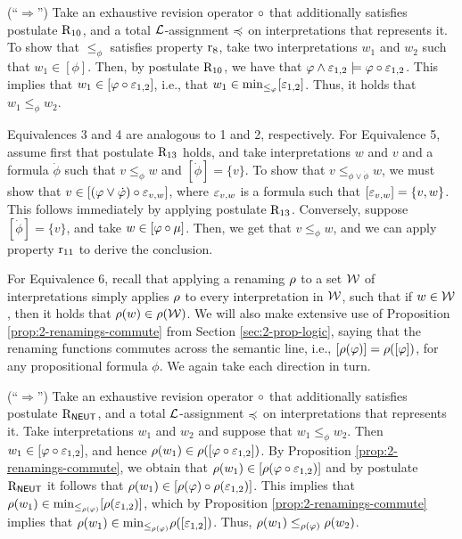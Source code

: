 \begin{prf*}{}{}
	(``$\Rightarrow$'')
	Take an exhaustive revision operator $\circ$ that additionally satisfies postulate $\mathrm{R}_{10}$,
	and a total $\mathcal{L}$-assignment $\preccurlyeq$ on interpretations that represents it.
	To show that $\le_\phi$ satisfies property $\mathrm{r}_{8}$,
	take two interpretations $w_1$ and $w_2$
	such that $w_1\in[\phi]$. 
	Then, by postulate $\mathrm{R}_{10}$, we have that 
	$\varphi\land\varepsilon_{1,2}\models\varphi\circ\varepsilon_{1,2}$.
	This implies that $w_1\in[\varphi \circ \varepsilon_{1,2}]$,
	i.e., that $w_1\in{\operatorname{min}}_{\le_\varphi}[\varepsilon_{1,2}]$.
	Thus, it holds that $w_1\le_\phi w_2$.

	Equivalences 3 and 4 are analogous to 1 and 2, respectively.
	For Equivalence 5, assume first that postulate $\mathrm{R}_{13}$ holds,
	and take interpretations $w$ and $v$ and a formula
	$\dot{\phi}$ such that
	$v\le_\phi w$ and $[\dot{\phi}]=\{v\}$.
	To show that $v\le_{\phi\lor\dot{\phi}}w$,
	we must show that $v\in[(\varphi\lor\dot{\varphi})\circ\varepsilon_{v,w}]$,
	where $\varepsilon_{v,w}$ is a formula such that
	$[\varepsilon_{v,w}] = \{v,w\}$. This follows immediately 
	by applying postulate $\mathrm{R}_{13}$.
	Conversely, suppose $[\dot{\phi}]=\{v\}$,
	and take $w\in[\varphi\circ\mu]$.
	Then, we get that $v\le_\phi w$, and we can apply property $\mathrm{r}_{11}$
	to derive the conclusion.
	
	For Equivalence 6, recall that applying a renaming $\rho$ to a set $\mathcal{W}$ of interpretations
	simply applies $\rho$ to every interpretation in $\mathcal{W}$, such that 
	if $w\in\mathcal{W}$, then it holds that $\rho(w)\in\rho(\mathcal{W})$.
	We will also make extensive use of 
	Proposition \ref{prop:2-renamings-commute} from Section \ref{sec:2-prop-logic},
	saying that the renaming functions commutes across the semantic line,
	i.e., $[\rho(\varphi)] = \rho([\varphi])$, for any propositional formula $\phi$.
	We again take each direction in turn.
	
	(``$\Rightarrow$'')
	Take an exhaustive revision operator $\circ$ that additionally satisfies postulate $\mathrm{R}_{\mathsf{NEUT}}$,
	and a total $\mathcal{L}$-assignment $\preccurlyeq$ on interpretations that represents it.
	Take interpretations $w_1$ and $w_2$ and suppose that $w_1\le_\phi w_2$.
	Then $w_1\in[\varphi\circ\varepsilon_{1,2}]$,
	and hence $\rho(w_1)\in\rho([\varphi\circ\varepsilon_{1,2}])$.
	By Proposition \ref{prop:2-renamings-commute},
	we obtain that $\rho(w_1)\in[\rho(\varphi\circ\varepsilon_{1,2})]$
	and by postulate $\mathrm{R}_{\mathsf{NEUT}}$ it follows that 
	$\rho(w_1)\in[\rho(\varphi)\circ\rho(\varepsilon_{1,2})]$.
	This implies that 
	$\rho(w_1)\in{\operatorname{min}}_{\le_{\rho(\varphi)}}[\rho(\varepsilon_{1,2})]$,
	which by Proposition \ref{prop:2-renamings-commute} 
	implies that 
	$\rho(w_1)\in{\operatorname{min}}_{\le_{\rho(\varphi)}}\rho([\varepsilon_{1,2}])$.
	Thus, $\rho(w_1)\le_{\rho(\varphi)}\rho(w_2)$.	


\end{prf*}
